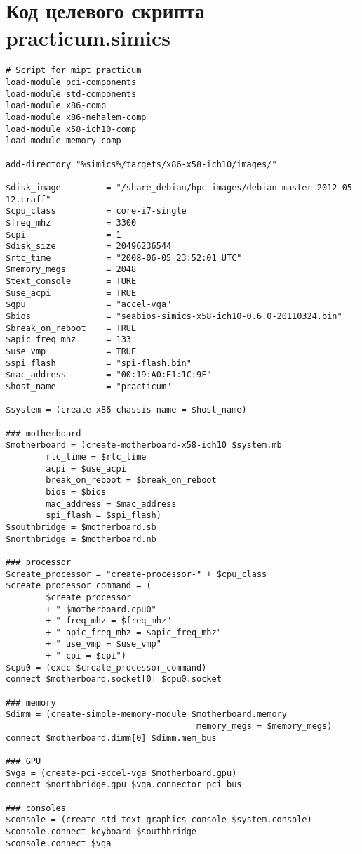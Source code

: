 \chapter{Код целевого скрипта practicum.simics}\label{chap:target-script}

\begin{lstlisting}
# Script for mipt practicum
load-module pci-components
load-module std-components
load-module x86-comp
load-module x86-nehalem-comp
load-module x58-ich10-comp
load-module memory-comp

add-directory "%simics%/targets/x86-x58-ich10/images/"

$disk_image         = "/share_debian/hpc-images/debian-master-2012-05-12.craff"
$cpu_class          = core-i7-single
$freq_mhz           = 3300
$cpi                = 1
$disk_size          = 20496236544
$rtc_time           = "2008-06-05 23:52:01 UTC"
$memory_megs        = 2048
$text_console       = TURE
$use_acpi           = TRUE
$gpu                = "accel-vga"
$bios               = "seabios-simics-x58-ich10-0.6.0-20110324.bin"
$break_on_reboot    = TRUE
$apic_freq_mhz      = 133
$use_vmp            = TRUE
$spi_flash          = "spi-flash.bin"
$mac_address        = "00:19:A0:E1:1C:9F"
$host_name          = "practicum"

$system = (create-x86-chassis name = $host_name)

### motherboard
$motherboard = (create-motherboard-x58-ich10 $system.mb
        rtc_time = $rtc_time
        acpi = $use_acpi
        break_on_reboot = $break_on_reboot
        bios = $bios
	    mac_address = $mac_address
        spi_flash = $spi_flash)
$southbridge = $motherboard.sb
$northbridge = $motherboard.nb

### processor
$create_processor = "create-processor-" + $cpu_class
$create_processor_command = (
        $create_processor
        + " $motherboard.cpu0"
        + " freq_mhz = $freq_mhz"
        + " apic_freq_mhz = $apic_freq_mhz"
        + " use_vmp = $use_vmp"
        + " cpi = $cpi")
$cpu0 = (exec $create_processor_command)
connect $motherboard.socket[0] $cpu0.socket

### memory
$dimm = (create-simple-memory-module $motherboard.memory
                                      memory_megs = $memory_megs)
connect $motherboard.dimm[0] $dimm.mem_bus

### GPU
$vga = (create-pci-accel-vga $motherboard.gpu)
connect $northbridge.gpu $vga.connector_pci_bus

### consoles
$console = (create-std-text-graphics-console $system.console)
$console.connect keyboard $southbridge
$console.connect $vga


\end{lstlisting}
